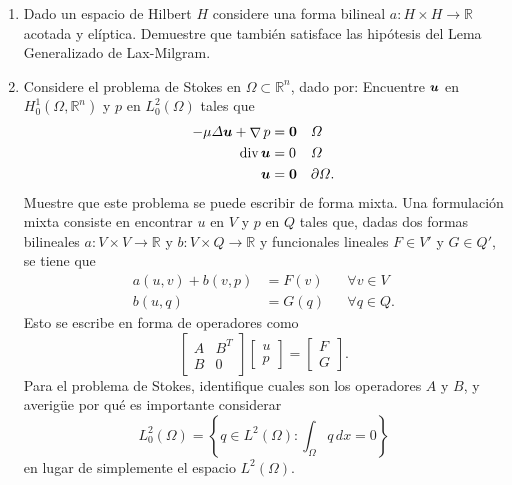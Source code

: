 \documentclass{article}
\renewcommand{\vec}{\vectorsym}
\DeclareMathOperator{\grad}{\nabla}
\DeclareMathOperator{\dive}{\text{div}}
\newcommand{\R}{\mathbb{R}}
\newcommand{\pts}[1]{[{\bf #1 puntos}] }
\begin{document}
\begin{enumerate}

    \item\pts{1} Dado un espacio de Hilbert $H$ considere una forma bilineal $a:H\times H\to \R$ acotada y elíptica. Demuestre que también satisface las hipótesis del Lema Generalizado de Lax-Milgram.

    \item\pts{3} Considere el problema de Stokes en $\Omega\subset \R^n$, dado por: Encuentre $\vec u$ en $H_0^1(\Omega,\R^n)$ y $p$ en $L_0^2(\Omega)$ tales que
            $$\begin{aligned}
                -\mu \Delta \vec u + \grad p &= \vec 0 &&\Omega \\
                \dive \vec u &=0 &&\Omega \\
                \vec u &= \vec 0 && \partial \Omega.
            \end{aligned}$$
            Muestre que este problema se puede escribir de forma mixta. Una formulación mixta consiste en encontrar $u$ en $V$ y $p$ en $Q$ tales que, dadas dos formas bilineales $a:V\times V\to \R$ y $b:V\times Q\to \R$ y funcionales lineales $F\in V'$ y $G\in Q'$, se tiene que
            $$\begin{aligned}
                a(u, v) + b(v, p) &= F(v) &&\forall v\in V\\
                b(u,q)            &= G(q) &&\forall q\in Q.
            \end{aligned}$$
            Esto se escribe en forma de operadores como 
            $$ \begin{bmatrix} A & B^T \\ B & 0 \end{bmatrix}\begin{bmatrix}u \\ p \end{bmatrix} = \begin{bmatrix} F \\ G \end{bmatrix}. $$
            Para el problema de Stokes, identifique cuales son los operadores $A$ y $B$, y averigüe por qué es importante considerar 
                $$L_0^2(\Omega) = \left\{ q \in L^2(\Omega): \int_\Omega q\,dx = 0 \right\}$$
            en lugar de simplemente el espacio $L^2(\Omega)$. 


\end{enumerate}
\end{document}
